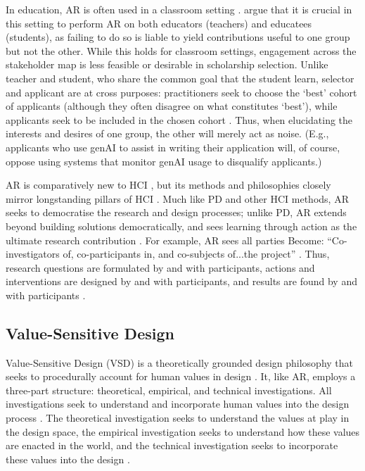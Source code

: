 In education, AR is often used in a classroom setting \cite{Mertler_2019}. \textcite{venn-wycherley_realities_2024} argue that it is crucial in this setting to perform AR on both educators (teachers) and educatees (students), as failing to do so is liable to yield contributions useful to one group but not the other. While this holds for classroom settings, engagement across the stakeholder map is less feasible or desirable in scholarship selection. Unlike teacher and student, who share the common goal that the student learn, selector and applicant are at cross purposes: practitioners seek to choose the `best' cohort of applicants (although they often disagree on what constitutes `best'), while applicants seek to be included in the chosen cohort \cite{bergman2021seven}. Thus, when elucidating the interests and desires of one group, the other will merely act as noise. (E.g., applicants who use genAI to assist in writing their application will, of course, oppose using systems that monitor genAI usage to disqualify applicants.)

AR is comparatively new to HCI \cite{Hayes_2011,lu_organizing_2023}, but its methods and philosophies closely mirror longstanding pillars of HCI \cite{Hayes_2011}. Much like PD and other HCI methods, AR seeks to democratise the research and design processes; unlike PD, AR extends beyond building solutions democratically, and sees learning through action as the ultimate research contribution \cite{Hayes_2011}. For example, AR sees all parties Become: ``Co-investigators of, co-participants in, and co-subjects of...the project'' \cite{Hayes_2011}.  Thus, research questions are formulated by and with participants, actions and interventions are designed by and with participants, and results are found by and with participants \cite{Hayes_2011}.

\subsection{Value-Sensitive Design}\label{ssec:value_sensitive_design}
Value-Sensitive Design (VSD) is a theoretically grounded design philosophy that seeks to procedurally account for human values in design \cite{batyavalue}. It, like AR, employs a three-part structure: theoretical, empirical, and technical investigations. All investigations seek to understand and incorporate human values into the design process \cite{10.1145/242485.242493}. The theoretical investigation seeks to understand the values at play in the design space, the empirical investigation seeks to understand how these values are enacted in the world, and the technical investigation seeks to incorporate these values into the design \cite{10.1145/242485.242493}.


